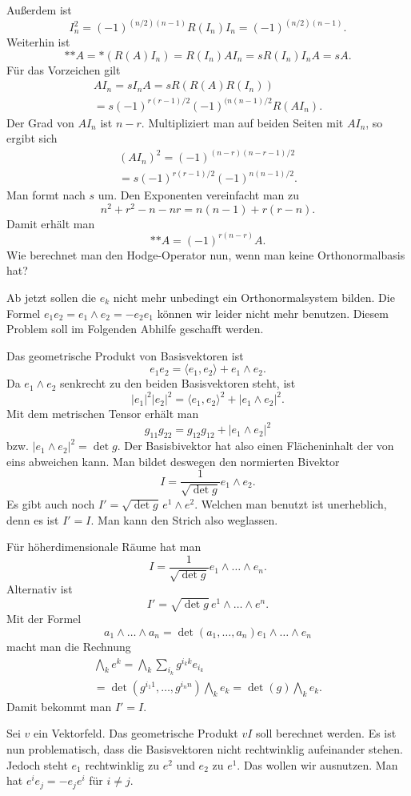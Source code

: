 \documentclass[a4paper,10pt,fleqn,twocolumn,twoside]{article}
\begin{document}
Außerdem ist
\[I_n^2 = (-1)^{(n/2)(n-1)} R(I_n)I_n = (-1)^{(n/2)(n-1)}.\]
Weiterhin ist
\[*{*A} = *(R(A)I_n) = R(I_n)AI_n = sR(I_n)I_nA = sA.
\]
Für das Vorzeichen gilt
\begin{gather*}
AI_n = sI_nA = sR(R(A)R(I_n))\\
= s(-1)^{r(r-1)/2}(-1)^{(n(n-1)/2} R(AI_n).
\end{gather*}
Der Grad von \(AI_n\) ist \(n-r\).
Multipliziert man auf beiden Seiten mit \(AI_n\), so ergibt sich
\begin{gather*}
(AI_n)^2 = (-1)^{(n-r)(n-r-1)/2}\\
= s(-1)^{r(r-1)/2}(-1)^{n(n-1)/2}.
\end{gather*}
Man formt nach \(s\) um. Den Exponenten vereinfacht man zu
\[n^2+r^2-n-nr = n(n-1) + r(r-n).\]
Damit erhält man
\[*{*A} = (-1)^{r(n-r)}A.\]
Wie berechnet man den Hodge-Operator nun, wenn man keine
Orthonormalbasis hat?

Ab jetzt sollen die \(e_k\) nicht mehr unbedingt ein Orthonormalsystem
bilden. Die Formel \(e_1e_2=e_1\wedge e_2=-e_2e_1\) können wir leider
nicht mehr benutzen. Diesem Problem soll im Folgenden Abhilfe
geschafft werden.

Das geometrische Produkt von Basisvektoren ist
\[e_1e_2 = \langle e_1,e_2\rangle + e_1\wedge e_2.\]
Da \(e_1\wedge e_2\) senkrecht zu den beiden Basisvektoren steht, ist
\[|e_1|^2|e_2|^2 = \langle e_1,e_2\rangle^2+|e_1\wedge e_2|^2.\]
Mit dem metrischen Tensor erhält man
\[g_{11} g_{22} = g_{12} g_{12} + |e_1\wedge e_2|^2\]
bzw. \(|e_1\wedge e_2|^2 = \det g.\)
Der Basisbivektor hat also einen Flächeninhalt der von eins abweichen
kann. Man bildet deswegen den normierten Bivektor
\[I = \frac{1}{\sqrt{\det g}}e_1\wedge e_2.\]
Es gibt auch noch \(I'=\sqrt{\det g}\,e^1\wedge e^2\). Welchen man
benutzt ist unerheblich, denn es ist \(I'=I\). Man kann den Strich
also weglassen.

Für höherdimensionale Räume hat man
\[I = \frac{1}{\sqrt{\det g}}e_1\wedge\ldots\wedge e_n.\]
Alternativ ist
\[I' = \sqrt{\det g}\,e^1\wedge\ldots\wedge e^n.\]
Mit der Formel
\[a_1\wedge\ldots\wedge a_n
= \det(a_1,\ldots,a_n)e_1\wedge\ldots\wedge e_n\]
macht man die Rechnung
\begin{gather*}
\bigwedge_k e^k
= \bigwedge_k \sum_{i_k} g^{{i_k}k} e_{i_k}\\
= \det(g^{{i_1}1},\ldots,g^{{i_n}n})\bigwedge_k e_k
= \det(g)\bigwedge_k e_k.
\end{gather*}
Damit bekommt man \(I'=I\).

Sei \(v\) ein Vektorfeld. Das geometrische Produkt \(vI\)
soll berechnet werden. Es ist nun problematisch, dass die
Basisvektoren nicht rechtwinklig aufeinander stehen. Jedoch
steht \(e_1\) rechtwinklig zu \(e^2\) und \(e_2\) zu \(e^1\).
Das wollen wir ausnutzen. Man hat \(e^ie_j=-e_je^i\) für \(i\ne j\).
\end{document}
